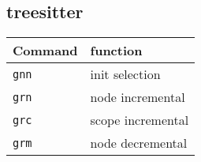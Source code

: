 \subsection*{treesitter}
\begin{tabular}{l l}
  \toprule
  Command      & function           \\
  \midrule
  \texttt{gnn} & init selection \\
  \texttt{grn} & node incremental \\
  \texttt{grc} & scope incremental \\
  \texttt{grm} & node decremental \\
  \bottomrule
\end{tabular}
